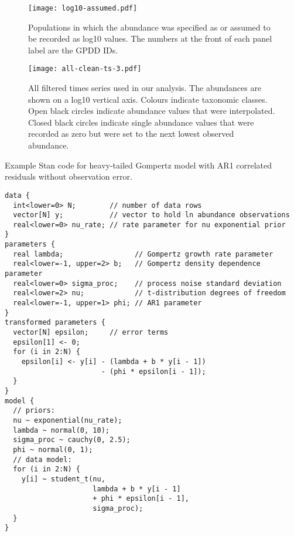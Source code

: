 \documentclass[11pt]{article}
\begin{document}
\clearpage


\begin{figure}[htbp]
\begin{center}
\texttt{[image: log10-assumed.pdf]} \caption{Populations in which the abundance was specified as or assumed to be recorded as log10 values. The numbers at the front of each panel label are the GPDD IDs.}
    \label{fig:log10-assumed}
\end{center}
\end{figure}



\begin{figure}[htbp]
\begin{center}
\texttt{[image: all-clean-ts-3.pdf]} \caption{All filtered times series used in our analysis. The abundances are shown on a log10 vertical axis. Colours indicate taxonomic classes. Open black circles indicate abundance values that were interpolated. Closed black circles indicate single abundance values that were recorded as zero but were set to the next lowest observed abundance.}
    \label{fig:all-ts}
\end{center}
\end{figure}

\clearpage

\noindent
Example Stan code for heavy-tailed Gompertz model with AR1 correlated residuals without observation error.

\begin{verbatim}
data {
  int<lower=0> N;        // number of data rows
  vector[N] y;           // vector to hold ln abundance observations
  real<lower=0> nu_rate; // rate parameter for nu exponential prior
}
parameters {
  real lambda;                 // Gompertz growth rate parameter
  real<lower=-1, upper=2> b;   // Gompertz density dependence parameter
  real<lower=0> sigma_proc;    // process noise standard deviation
  real<lower=2> nu;            // t-distribution degrees of freedom
  real<lower=-1, upper=1> phi; // AR1 parameter
}
transformed parameters {
  vector[N] epsilon;     // error terms
  epsilon[1] <- 0;
  for (i in 2:N) {
    epsilon[i] <- y[i] - (lambda + b * y[i - 1])
                       - (phi * epsilon[i - 1]);
  }
}
model {
  // priors:
  nu ~ exponential(nu_rate);
  lambda ~ normal(0, 10);
  sigma_proc ~ cauchy(0, 2.5);
  phi ~ normal(0, 1);
  // data model:
  for (i in 2:N) {
    y[i] ~ student_t(nu,
                     lambda + b * y[i - 1]
                     + phi * epsilon[i - 1],
                     sigma_proc);
  }
}
\end{verbatim}
\end{document}
